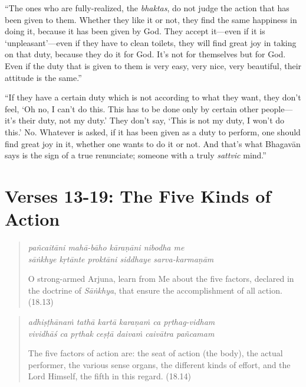 \documentclass[12pt, twoside, openright]{memoir}
\begin{document}
\enquote{The ones who are fully-realized, the \textit{bhaktas}, do not judge the action that has been given to them. Whether they like it or not, they find the same happiness in doing it, because it has been given by God. They accept it---even if it is \enquote{unpleasant}---even if they have to clean toilets, they will find great joy in taking on that duty, because they do it for God. It’s not for themselves but for God. Even if the duty that is given to them is very easy, very nice, very beautiful, their attitude is the same.}

\enquote{If they have a certain duty which is not according to what they want, they don’t feel, \enquote{Oh no, I can’t do this. This has to be done only by certain other people---it’s their duty, not my duty.} They don’t say, \enquote{This is not my duty, I won’t do this.} No. Whatever is asked, if it has been given as a duty to perform, one should find great joy in it, whether one wants to do it or not. And that’s what Bhagavān says is the sign of a true renunciate; someone with a truly \textit{sattvic} mind.}

\section{Verses 13-19: The Five Kinds of Action}\label{sec-verses-13-19-the-five-kinds-of-action}


\par
\begin{verse}
\textit{pañcaitāni mahā-bāho kāraṇāni nibodha me} \\
\textit{sāṅkhye kṛtānte proktāni siddhaye sarva-karmaṇām}

\noindent O strong-armed Arjuna, learn from Me about the five factors, declared in the doctrine of \textit{Sāṅkhya}, that ensure the accomplishment of all action. (18.13)
\end{verse}
\par



\par
\begin{verse}
\textit{adhiṣṭhānaṁ tathā kartā karaṇaṁ ca pṛthag-vidham} \\
\textit{vividhāś ca pṛthak ceṣṭā daivaṁ caivātra pañcamam}

\noindent The five factors of action are: the seat of action (the body), the actual performer, the various sense organs, the different kinds of effort, and the Lord Himself, the fifth in this regard. (18.14)
\end{verse}
\par
\end{document}
